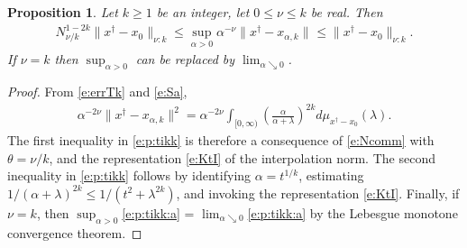 \documentclass[10pt, a4paper]{iopart}
\newcommand{\norm}[2]{     \| #1       \|_{ #2 }}
\newtheorem{proposition}[lemma]{Proposition}
\theoremstyle{remark}
\theoremstyle{definition}
\begin{document}
\begin{proposition}
\label{p:tikk}
	Let $k \geq 1$ be an integer, let $0 \leq \nu \leq k$ be real.
	Then
	\begin{align}
	\label{e:p:tikk}
		N_{\nu / k}^{1 - 2 k}
		\norm{ x^\dag - x_0 }{\nu : k}
		\leq
		\sup_{\alpha > 0}
		\alpha^{-\nu}
		\norm{ x^\dag - x_{\alpha,k} }{}
		\leq
		\norm{ x^\dag - x_0 }{\nu : k}
		.
	\end{align}
	If $\nu = k$ then $\sup_{\alpha > 0}$ can be replaced by $\lim_{\alpha \searrow 0}$.
\end{proposition}
%
%
\begin{proof}
	From \eqref{e:errTk} and \eqref{e:Sa},
	\begin{align}
	\label{e:p:tikk:a}
		\alpha^{-2 \nu}
		\norm{ x^\dag - x_{\alpha,k} }{}^2
	 	=
	 	\alpha^{-2 \nu}
	 	\int_{[0, \infty)}
	 	\left( \frac{\alpha}{\alpha + \lambda} \right)^{2 k}
	 	d \mu_{x^\dag - x_0}(\lambda)
		.
	\end{align}
	The first inequality in \eqref{e:p:tikk}
	is therefore a consequence of \eqref{e:Ncomm}
	with $\theta = \nu / k$,
	and the representation \eqref{e:KtI} of the interpolation norm.
	The second inequality in \eqref{e:p:tikk}
	follows by identifying $\alpha = t^{1/k}$,
	estimating
	$1 / (\alpha + \lambda)^{2 k} \leq 1 / ( t^2 + \lambda^{2 k} )$,
	and
	invoking the representation \eqref{e:KtI}.
	Finally,
	if $\nu = k$,
	then
	$\sup_{\alpha > 0}$\eqref{e:p:tikk:a} = 
	$\lim_{\alpha \searrow 0}$\eqref{e:p:tikk:a}
	by
	the Lebesgue monotone convergence theorem.
\end{proof}



%
\end{document}
